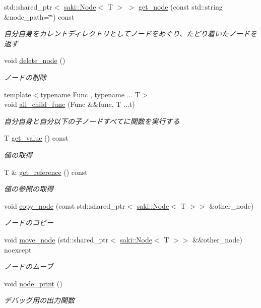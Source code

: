 \begin{DoxyCompactItemize}
std\+::shared\+\_\+ptr$<$ \mbox{\hyperlink{classsaki_1_1_node}{saki\+::\+Node}}$<$ T $>$ $>$ \mbox{\hyperlink{classsaki_1_1_node_a8faa1ffea41b2d9d0ceb337753fa1831}{get\+\_\+node}} (const std\+::string \&node\+\_\+path=\char`\"{}\char`\"{}) const
\begin{DoxyCompactList}\small\item\em 自分自身をカレントディレクトリとしてノードをめぐり、たどり着いたノードを返す \end{DoxyCompactList}\item 
void \mbox{\hyperlink{classsaki_1_1_node_a57d63d7ba5c2f3bba02a042bbad12dc4}{delete\+\_\+node}} ()
\begin{DoxyCompactList}\small\item\em ノードの削除 \end{DoxyCompactList}\item 
{\footnotesize template$<$typename Func , typename ... T$>$ }\\void \mbox{\hyperlink{classsaki_1_1_node_aad51acc43e01039b19d22f4f09689f3b}{all\+\_\+child\+\_\+func}} (Func \&\&func, T ...t)
\begin{DoxyCompactList}\small\item\em 自分自身と自分以下の子ノードすべてに関数を実行する \end{DoxyCompactList}\item 
T \mbox{\hyperlink{classsaki_1_1_node_a9e88537adb4d8b79fe456f2496ed1bca}{get\+\_\+value}} () const
\begin{DoxyCompactList}\small\item\em 値の取得 \end{DoxyCompactList}\item 
T \& \mbox{\hyperlink{classsaki_1_1_node_a91d632d4db82e0415f394b14c5f6ce58}{get\+\_\+reference}} () const
\begin{DoxyCompactList}\small\item\em 値の参照の取得 \end{DoxyCompactList}\item 
void \mbox{\hyperlink{classsaki_1_1_node_abadf381e5eb35263032f833d695be89b}{copy\+\_\+node}} (const std\+::shared\+\_\+ptr$<$ \mbox{\hyperlink{classsaki_1_1_node}{saki\+::\+Node}}$<$ T $>$$>$ \&other\+\_\+node)
\begin{DoxyCompactList}\small\item\em ノードのコピー \end{DoxyCompactList}\item 
void \mbox{\hyperlink{classsaki_1_1_node_a520f9d300a014a99afd058fe0093d06f}{move\+\_\+node}} (std\+::shared\+\_\+ptr$<$ \mbox{\hyperlink{classsaki_1_1_node}{saki\+::\+Node}}$<$ T $>$$>$ \&\&other\+\_\+node) noexcept
\begin{DoxyCompactList}\small\item\em ノードのムーブ \end{DoxyCompactList}\item 
void \mbox{\hyperlink{classsaki_1_1_node_ac5b08cdb3fd3c60e38d849b7d18a9782}{node\+\_\+print}} ()
\begin{DoxyCompactList}\small\item\em デバッグ用の出力関数 \end{DoxyCompactList}\end{DoxyCompactItemize}
